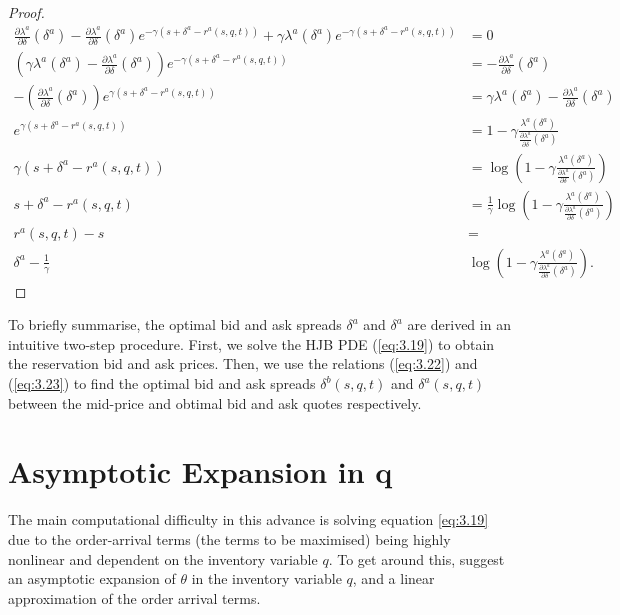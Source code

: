 \begin{proof}
\begin{align*}
        \frac{\partial\lambda^a}{\partial\delta}(\delta^a)-\frac{\partial\lambda^a}{\partial\delta}(\delta^a)e^{-\gamma(s+\delta^a-r^a(s,q,t))}+\gamma\lambda^a(\delta^a)e^{-\gamma(s+\delta^a-r^a(s,q,t))}&=0\\
        \left(\gamma\lambda^a(\delta^a)-\frac{\partial\lambda^a}{\partial\delta}(\delta^a)\right)e^{-\gamma(s+\delta^a-r^a(s,q,t))}&=-\frac{\partial\lambda^a}{\partial\delta}(\delta^a)\\
        -\left(\frac{\partial\lambda^a}{\partial\delta}(\delta^a)\right)e^{\gamma(s+\delta^a-r^a(s,q,t))}&=\gamma\lambda^a(\delta^a)-\frac{\partial\lambda^a}{\partial\delta}(\delta^a)\\
        e^{\gamma(s+\delta^a-r^a(s,q,t))}&=1-\gamma\frac{\lambda^a(\delta^a)}{\frac{\partial\lambda^a}{\partial\delta}(\delta^a)}\\
        \gamma(s+\delta^a-r^a(s,q,t))&=\log\left(1-\gamma\frac{\lambda^a(\delta^a)}{\frac{\partial\lambda^a}{\partial\delta}(\delta^a)}\right)\\
        s+\delta^a-r^a(s,q,t)&=\frac{1}{\gamma}\log\left(1-\gamma\frac{\lambda^a(\delta^a)}{\frac{\partial\lambda^a}{\partial\delta}(\delta^a)}\right)\\
        r^a(s,q,t)-s&=\\
        \delta^a-\frac{1}{\gamma}&\log\left(1-\gamma\frac{\lambda^a(\delta^a)}{\frac{\partial\lambda^a}{\partial\delta}(\delta^a)}\right).
    \end{align*}
\end{proof}

To briefly summarise, the optimal bid and ask spreads $\delta^a$ and $\delta^a$ are
derived in an intuitive two-step procedure. First, we solve the HJB PDE (\ref{eq:3.19})
to obtain the reservation bid and ask prices. Then, we use the relations (\ref{eq:3.22})
and (\ref{eq:3.23}) to find the optimal bid and ask spreads $\delta^b(s,q,t)$ and 
$\delta^a(s,q,t)$ between the mid-price and obtimal bid and ask quotes respectively.

\section{Asymptotic Expansion in q}\label{sec:3.8}

The main computational difficulty in this advance is solving equation \ref{eq:3.19}
due to the order-arrival terms (the terms to be maximised) being highly nonlinear and
dependent on the inventory variable $q$. To get around this, \cite{AS2008} suggest
an asymptotic expansion of $\theta$ in the inventory variable $q$, and a linear 
approximation of the order arrival terms. 

